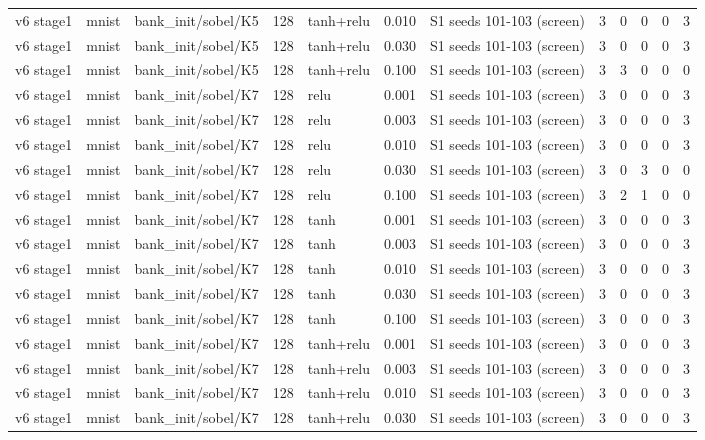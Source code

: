 \begin{table}[htbp]
{\begin{tabular}{@{}lllrlrlrrrrr@{}}
v6 stage1 & mnist & bank\_init/sobel/K5 & 128 & tanh+relu & 0.010 & S1 seeds 101-103 (screen) & 3 & 0 & 0 & 0 & 3 \\
v6 stage1 & mnist & bank\_init/sobel/K5 & 128 & tanh+relu & 0.030 & S1 seeds 101-103 (screen) & 3 & 0 & 0 & 0 & 3 \\
v6 stage1 & mnist & bank\_init/sobel/K5 & 128 & tanh+relu & 0.100 & S1 seeds 101-103 (screen) & 3 & 3 & 0 & 0 & 0 \\
v6 stage1 & mnist & bank\_init/sobel/K7 & 128 & relu & 0.001 & S1 seeds 101-103 (screen) & 3 & 0 & 0 & 0 & 3 \\
v6 stage1 & mnist & bank\_init/sobel/K7 & 128 & relu & 0.003 & S1 seeds 101-103 (screen) & 3 & 0 & 0 & 0 & 3 \\
v6 stage1 & mnist & bank\_init/sobel/K7 & 128 & relu & 0.010 & S1 seeds 101-103 (screen) & 3 & 0 & 0 & 0 & 3 \\
v6 stage1 & mnist & bank\_init/sobel/K7 & 128 & relu & 0.030 & S1 seeds 101-103 (screen) & 3 & 0 & 3 & 0 & 0 \\
v6 stage1 & mnist & bank\_init/sobel/K7 & 128 & relu & 0.100 & S1 seeds 101-103 (screen) & 3 & 2 & 1 & 0 & 0 \\
v6 stage1 & mnist & bank\_init/sobel/K7 & 128 & tanh & 0.001 & S1 seeds 101-103 (screen) & 3 & 0 & 0 & 0 & 3 \\
v6 stage1 & mnist & bank\_init/sobel/K7 & 128 & tanh & 0.003 & S1 seeds 101-103 (screen) & 3 & 0 & 0 & 0 & 3 \\
v6 stage1 & mnist & bank\_init/sobel/K7 & 128 & tanh & 0.010 & S1 seeds 101-103 (screen) & 3 & 0 & 0 & 0 & 3 \\
v6 stage1 & mnist & bank\_init/sobel/K7 & 128 & tanh & 0.030 & S1 seeds 101-103 (screen) & 3 & 0 & 0 & 0 & 3 \\
v6 stage1 & mnist & bank\_init/sobel/K7 & 128 & tanh & 0.100 & S1 seeds 101-103 (screen) & 3 & 0 & 0 & 0 & 3 \\
v6 stage1 & mnist & bank\_init/sobel/K7 & 128 & tanh+relu & 0.001 & S1 seeds 101-103 (screen) & 3 & 0 & 0 & 0 & 3 \\
v6 stage1 & mnist & bank\_init/sobel/K7 & 128 & tanh+relu & 0.003 & S1 seeds 101-103 (screen) & 3 & 0 & 0 & 0 & 3 \\
v6 stage1 & mnist & bank\_init/sobel/K7 & 128 & tanh+relu & 0.010 & S1 seeds 101-103 (screen) & 3 & 0 & 0 & 0 & 3 \\
v6 stage1 & mnist & bank\_init/sobel/K7 & 128 & tanh+relu & 0.030 & S1 seeds 101-103 (screen) & 3 & 0 & 0 & 0 & 3 \\

\end{tabular}}
\end{table}
